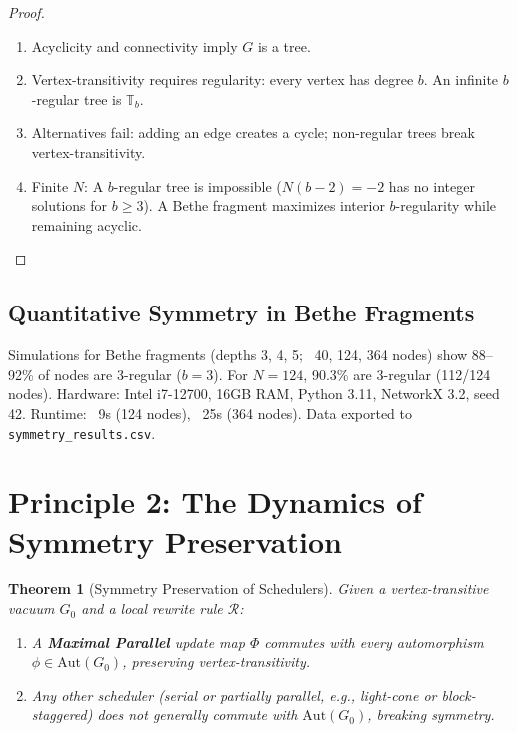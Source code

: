 \documentclass[11pt, a4paper]{article}
\newtheorem{theorem}{Theorem}[section]
\begin{document}
\begin{proof}
\begin{enumerate}
  \item Acyclicity and connectivity imply $G$ is a tree.
  \item Vertex-transitivity requires regularity: every vertex has degree $b$. An infinite $b$-regular tree is $\mathbb{T}_b$.
  \item Alternatives fail: adding an edge creates a cycle; non-regular trees break vertex-transitivity.
  \item Finite $N$: A $b$-regular tree is impossible ($N(b-2) = -2$ has no integer solutions for $b \geq 3$). A Bethe fragment maximizes interior $b$-regularity while remaining acyclic.
\end{enumerate}
\end{proof}

\subsection{Quantitative Symmetry in Bethe Fragments}
Simulations for Bethe fragments (depths 3, 4, 5; ~40, 124, 364 nodes) show 88–92\% of nodes are 3-regular ($b=3$). For $N=124$, 90.3\% are 3-regular (112/124 nodes). Hardware: Intel i7-12700, 16GB RAM, Python 3.11, NetworkX 3.2, seed 42. Runtime: ~9s (124 nodes), ~25s (364 nodes). Data exported to \texttt{symmetry_results.csv}.

\section{Principle 2: The Dynamics of Symmetry Preservation}

\begin{theorem}[Symmetry Preservation of Schedulers]
\label{thm:scheduler_symmetry}
Given a vertex-transitive vacuum $G_0$ and a local rewrite rule $\mathcal{R}$:
\begin{enumerate}
  \item A \textbf{Maximal Parallel} update map $\Phi$ commutes with every automorphism $\phi \in \mathrm{Aut}(G_0)$, preserving vertex-transitivity.
  \item Any other scheduler (serial or partially parallel, e.g., light-cone or block-staggered) does not generally commute with $\mathrm{Aut}(G_0)$, breaking symmetry.
\end{enumerate}
\end{theorem}
\end{document}
